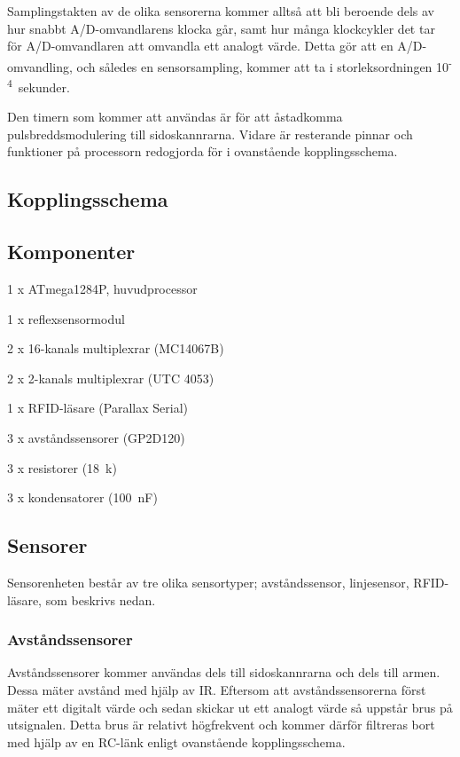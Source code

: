 Samplingstakten av de olika sensorerna kommer alltså att bli beroende dels av hur snabbt A/D-omvandlarens klocka går, samt hur många klockcykler det tar för A/D-omvandlaren att omvandla ett analogt värde. Detta gör att en A/D-omvandling, och således en sensorsampling, kommer att ta i storleksordningen 10\textsuperscript{-4}~sekunder.

Den timern som kommer att användas är för att åstadkomma pulsbreddsmodulering till sidoskannrarna. Vidare är resterande pinnar och funktioner på processorn redogjorda för i ovanstående kopplingsschema.


\subsection{Kopplingsschema}




\subsection{Komponenter}

\begin{packed_itemize}
\item 1 x ATmega1284P, huvudprocessor
\item 1 x reflexsensormodul
\item 2 x 16-kanals multiplexrar (MC14067B)
\item 2 x 2-kanals multiplexrar (UTC 4053)
\item 1 x RFID-läsare (Parallax Serial)
\item 3 x avståndssensorer (GP2D120)
\item 3 x resistorer (18~k\ohm)
\item 3 x kondensatorer (100~nF)
\end{packed_itemize}


\subsection{Sensorer}
Sensorenheten består av tre olika sensortyper; avståndssensor, linjesensor, RFID-läsare, som beskrivs nedan. 

\subsubsection{Avståndssensorer}
Avståndssensorer kommer användas dels till sidoskannrarna och dels till armen. Dessa mäter avstånd med hjälp av IR. Eftersom att avståndssensorerna först mäter ett digitalt värde och sedan skickar ut ett analogt värde så uppstår brus på utsignalen. Detta brus är relativt högfrekvent och kommer därför filtreras bort med hjälp av en RC-länk enligt ovanstående kopplingsschema. 


